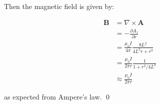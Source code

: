 \documentclass[12pt]{article}
\begin{document}
Then the magnetic field is given by:

\begin{equation}
    \begin{split}
        \mathbf{B} &= \nabla \times \mathbf{A} \\
        &= -\frac{\partial A_{z}}{\partial r} \\
        &= \frac{\mu_{0} I}{4\pi} \frac{8L^{2}}{4L^{2}r + r^{3}} \\
        &= \frac{\mu_{0} I}{2\pi r} \frac{1}{1 + r^{2}/4L^{2}} \\
        &\approx \frac{\mu_{0} I}{2\pi r}
    \end{split}
\end{equation}

as expected from Ampere's law.
\qed
\end{document}

